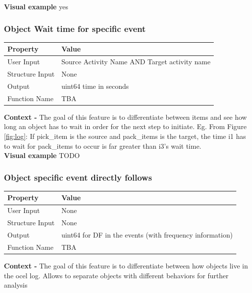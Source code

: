 \documentclass{article}
\begin{document}
\textbf{Visual example}
yes

\subsubsection{Object Wait time for specific event}
\begin{center}
	\begin{tabular}{| p{3cm} p{7cm} |}
		\hline
		\textbf{Property} & \textbf{Value}\\
		\hline
		User Input & Source Activity Name AND Target activity name\\
		Structure Input & None\\
		Output & uint64 time in seconds\\
		Function Name & TBA\\
		\hline
	\end{tabular}
\end{center}

\textbf{Context -} The goal of this feature is to differentiate between items and see how long an object has to wait in order for the next step to initiate. Eg. From Figure \ref{fig:log}: If pick\_item is the source and pack\_items is the target, the time i1 has to wait for pack\_items to occur is far greater than i3's wait time.
\\

\textbf{Visual example}
TODO

\subsubsection{Object specific event directly follows}
\begin{center}
	\begin{tabular}{| p{3cm} p{7cm} |}
		\hline
		\textbf{Property} & \textbf{Value}\\
		\hline
		User Input & None\\
		Structure Input & None\\
		Output & uint64 for DF in the events (with frequency information)\\
		Function Name & TBA\\
		\hline
	\end{tabular}
\end{center}

\textbf{Context -} The goal of this feature is to differentiate between how objects live in the ocel log. Allows to separate objects with different behaviors for further analysis
\\
\end{document}

